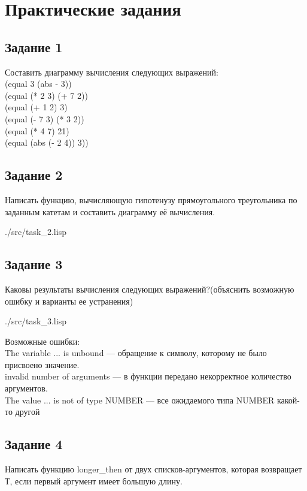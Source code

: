 \chapter*{Практические задания}

\section*{Задание 1}

Составить диаграмму вычисления следующих выражений: \\
(equal 3 (abs - 3)) \\
(equal (* 2 3) (+ 7 2)) \\
(equal (+ 1 2) 3) \\
(equal (- 7 3) (* 3 2)) \\
(equal (* 4 7) 21) \\
(equal (abs (- 2 4)) 3)) \\
\clearpage

\section*{Задание 2}
Написать функцию, вычисляющую гипотенузу прямоугольного треугольника по заданным катетам и составить диаграмму её вычисления.

\begin{lstinputlisting}[
	caption={Задание 2},
	label={lst:t2},
	style={lsp},
	]{./src/task_2.lisp}
\end{lstinputlisting}

\section*{Задание 3}
Каковы результаты вычисления следующих выражений?(объяснить возможную ошибку и варианты ее устранения)

\begin{lstinputlisting}[
	caption={Задание 3},
	label={lst:t3},
	style={lsp},
	]{./src/task_3.lisp}
\end{lstinputlisting}

Возможные ошибки:\\
The variable ... is unbound --- обращение к символу, которому не было присвоено значение.\\
invalid number of arguments --- в функции передано некорректное количество аргументов. \\
The value ... is not of type NUMBER --- все ожидаемого типа NUMBER какой-то другой

\section*{Задание 4}
Написать функцию longer\_then от двух списков-аргументов, которая возвращает Т, если первый аргумент имеет большую длину.

